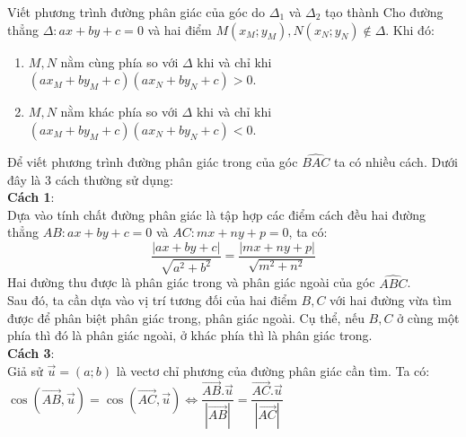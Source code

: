 \begin{dang}{Viết phương trình đường phân giác của góc do $\Delta_1$ và $\Delta_2$ tạo thành}
	Cho đường thẳng $\Delta\colon ax+by+c=0$ và hai điểm $M(x_M;y_M), N(x_N;y_N)\not\in \Delta$. Khi đó:
	\begin{enumerate}
		\item $M,N$ nằm cùng phía so với $\Delta$ khi và chỉ khi $(ax_M+by_M+c)(ax_N+by_N+c)>0$.
		\item $M,N$ nằm khác phía so với $\Delta$ khi và chỉ khi $(ax_M+by_M+c)(ax_N+by_N+c)<0$.
	\end{enumerate}
	Để viết phương trình đường phân giác trong của góc $\widehat{BAC}$ ta có nhiều cách. Dưới đây là 3 cách thường sử dụng:\\
	\textbf{Cách 1}:\\ Dựa vào tính chất đường phân giác là tập hợp các điểm cách đều hai đường thẳng $AB:ax+by+c=0$ và $AC: mx+ny+p=0$, ta có:
	$$\dfrac{|ax+by+c|}{\sqrt{a^2+b^2}}=\dfrac{|mx+ny+p|}{\sqrt{m^2+n^2}}$$
	Hai đường thu được là phân giác trong và phân giác ngoài của góc $\widehat{ABC}$.\\
	Sau đó, ta cần dựa vào vị trí tương đối của hai điểm $B,C$ với hai đường vừa tìm được để phân biệt phân giác trong, phân giác ngoài. Cụ thể, nếu $B,C$ ở cùng một phía thì đó là phân giác ngoài, ở khác phía thì là phân giác trong.\\
	\textbf{Cách 3}: \\
	Giả sử $\vec{u}=(a;b)$ là vectơ chỉ phương của đường phân giác cần tìm. Ta có: \\
	$\cos (\vec{AB}, \vec{u}) = \cos (\vec{AC}, \vec{u}) \Leftrightarrow  \dfrac{\vec{AB}.\vec{u}}{\left|\vec{AB}\right|} = \dfrac{\vec{AC}.\vec{u}}{\left|\vec{AC}\right| }$
\end{dang}


